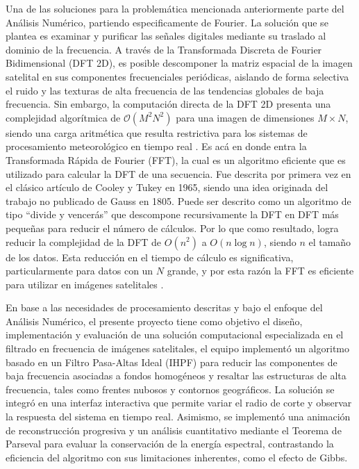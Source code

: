 \documentclass[conference]{IEEEtran}
\begin{document}
Una de las soluciones para la problemática mencionada anteriormente parte del Análisis Numérico, partiendo especificamente de Fourier. La solución que se plantea es examinar y purificar las señales digitales mediante su traslado al dominio de la frecuencia. A través de la Transformada Discreta de Fourier Bidimensional (DFT 2D), es posible descomponer la matriz espacial de la imagen satelital en sus componentes frecuenciales periódicas, aislando de forma selectiva el ruido y las texturas de alta frecuencia de las tendencias globales de baja frecuencia. Sin embargo, la computación directa de la DFT 2D presenta una complejidad algorítmica de $\mathcal{O}(M^2 N^2)$ para una imagen de dimensiones $M \times N$, siendo una carga aritmética que resulta restrictiva para los sistemas de procesamiento meteorológico en tiempo real \cite{gonzalez2018}. Es acá en donde entra la Transformada Rápida de Fourier (FFT), la cual es un algoritmo eficiente que es utilizado para calcular la DFT de una secuencia. Fue descrita por primera vez en el clásico artículo de Cooley y Tukey en 1965, siendo una idea originada del trabajo no publicado de Gauss en 1805. Puede ser descrito como un algoritmo de tipo ``divide y vencerás'' que descompone recursivamente la DFT en DFT más pequeñas para reducir el número de cálculos. Por lo que como resultado, logra reducir la complejidad de la DFT de \(O(n^2)\) a \(O(n \log n)\), siendo \(n\) el tamaño de los datos. Esta reducción en el tiempo de cálculo es significativa, particularmente para datos con un \(N\) grande, y por esta razón la FFT es eficiente para utilizar en imágenes satelitales \cite{kong2020python}.

En base a las necesidades de procesamiento descritas y bajo el enfoque del Análisis Numérico, el presente proyecto tiene como objetivo el diseño, implementación y evaluación de una solución computacional especializada en el filtrado en frecuencia de imágenes satelitales, el equipo implementó un algoritmo basado en un Filtro Pasa-Altas Ideal (IHPF) para reducir las componentes de baja frecuencia asociadas a fondos homogéneos y resaltar las estructuras de alta frecuencia, tales como frentes nubosos y contornos geográficos. La solución se integró en una interfaz interactiva que permite variar el radio de corte y observar la respuesta del sistema en tiempo real. Asimismo, se implementó una animación de reconstrucción progresiva y un análisis cuantitativo mediante el Teorema de Parseval para evaluar la conservación de la energía espectral, contrastando la eficiencia del algoritmo con sus limitaciones inherentes, como el efecto de Gibbs.
\end{document}
